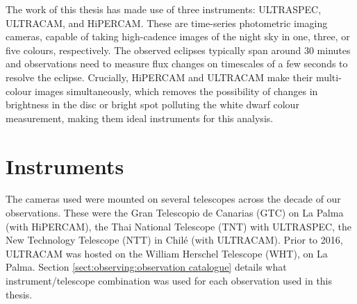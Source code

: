 
\label{chpt:observations and observational techniques} %


The work of this thesis has made use of three instruments: ULTRASPEC, ULTRACAM, and HiPERCAM.
These are time-series photometric imaging cameras, capable of taking high-cadence images of the night sky in one, three, or five colours, respectively.
The observed eclipses typically span around 30 minutes and observations need to measure flux changes on timescales of a few seconds to resolve the eclipse.
Crucially, HiPERCAM and ULTRACAM make their multi-colour images simultaneously, which removes the possibility of changes in brightness in the disc or bright spot polluting the white dwarf colour measurement, making them ideal instruments for this analysis.


\section{Instruments}
\label{sect:observations:cameras}

The cameras used were mounted on several telescopes across the decade of our observations. These were the Gran Telescopio de Canarias (GTC) on La Palma (with HiPERCAM), the Thai National Telescope (TNT) with ULTRASPEC, the New Technology Telescope (NTT) in Chil\'e (with ULTRACAM). Prior to 2016, ULTRACAM was hosted on the William Herschel Telescope (WHT), on La Palma. Section \ref{sect:observing:observation catalogue} details what instrument/telescope combination was used for each observation used in this thesis.


